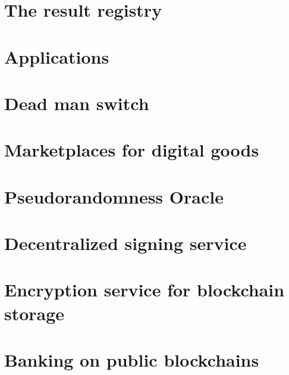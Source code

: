 \documentclass[11pt]{article}
\begin{document}
\section{The result registry}

\section{Applications}

\section{Dead man switch}
\section{Marketplaces for digital goods}
\section{Pseudorandomness Oracle}
\section{Decentralized signing service}
\section{Encryption service for blockchain storage}
\section{Banking on public blockchains}
\end{document}
